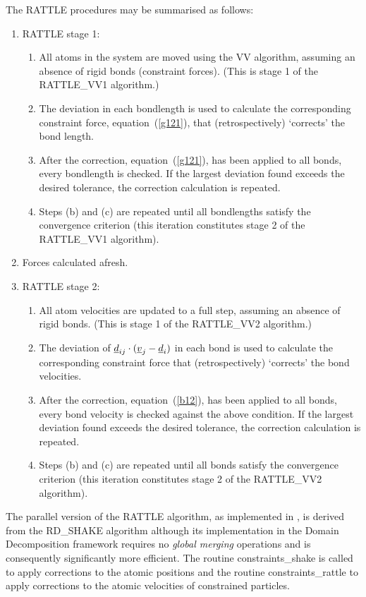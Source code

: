 The RATTLE procedures may be summarised as follows:
\begin{enumerate}
\item RATTLE stage 1:
\begin{enumerate}
\item All atoms in the system are moved using the
VV algorithm, assuming an absence of
rigid bonds (constraint forces).  (This is
stage 1 of the RATTLE\_VV1 algorithm.)
\item The deviation in each bondlength is used to calculate the
corresponding constraint force, equation~(\ref{g121}), that (retrospectively)
`corrects' the bond length.
\item After the correction, equation~(\ref{g121}), has been applied to all
bonds, every bondlength is checked.  If the largest deviation found
exceeds the desired tolerance, the correction calculation is
repeated.
\item Steps (b) and (c) are repeated until all
bondlengths satisfy the convergence criterion (this iteration
constitutes stage 2 of the RATTLE\_VV1 algorithm).
\end{enumerate}
\item Forces calculated afresh.
\item RATTLE stage 2:
\begin{enumerate}
\item All atom velocities are updated to a full step, assuming an
absence of rigid bonds.  (This is stage 1
of the RATTLE\_VV2 algorithm.)
\item The deviation of $\mbox{$\underline{d}$}_{ij} \cdot (\mbox{$\underline{v}$}_{j}-\mbox{$\underline{d}$}_{i})$
in each bond is used to calculate the corresponding constraint
force that (retrospectively) `corrects' the bond velocities.
\item After the correction, equation~(\ref{b12}), has been applied to all
bonds, every bond velocity is checked against the above condition.  If the
largest deviation found exceeds the desired tolerance, the correction
calculation is repeated.
\item Steps (b) and (c) are repeated until all bonds satisfy the
convergence criterion (this iteration constitutes stage 2 of the
RATTLE\_VV2 algorithm).
\end{enumerate}
\end{enumerate}

The parallel version of the RATTLE algorithm, as implemented in
\D, is derived from the RD\_SHAKE
algorithm \cite{smith-94b} although its implementation in the
Domain Decomposition framework requires no {\em global merging}
operations and is consequently significantly more efficient.  The
routine {\sc constraints\_shake} is called to apply corrections to
the atomic positions and the routine {\sc constraints\_rattle} to
apply corrections to the atomic velocities of constrained particles.

